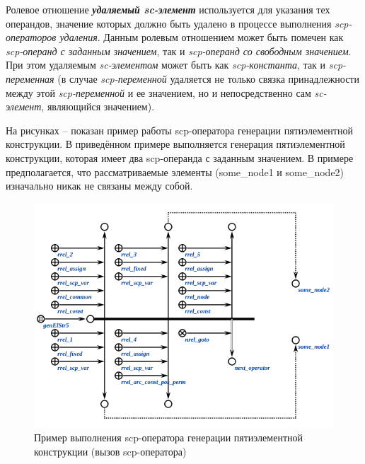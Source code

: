 Ролевое отношение \textbf{\textit{удаляемый sc-элемент\scnrolesign}} используется для указания тех операндов, значение которых должно быть удалено в процессе выполнения \textit{scp-операторов удаления}. Данным ролевым отношением может быть помечен как \textit{scp-операнд с заданным значением\scnrolesign}, так и \textit{scp-операнд со свободным значением\scnrolesign}. При этом удаляемым \textit{sc-элементом} может быть как \textit{scp-константа\scnrolesign}, так и \textit{scp-переменная\scnrolesign} (в случае \textit{scp-переменной\scnrolesign} удаляется не только связка принадлежности между этой \textit{scp-переменной\scnrolesign} и ее значением, но и непосредственно сам \textit{sc-элемент}, являющийся значением).

\begin{SCn}
\begin{scnhaselementset}
\end{scnhaselementset}
\begin{scnhaselementset}
\end{scnhaselementset}
\end{SCn}

На рисунках \textit{} -- \textit{} показан пример работы scp-оператора генерации пятиэлементной конструкции. В приведённом примере выполняется генерация пятиэлементной конструкции, которая имеет два scp-операнда с заданным значением. В примере предполагается, что рассматриваемые элементы (some\_node1 и some\_node2) изначально никак не связаны между собой.

\begin{figure}[H]
	\centering
	\includegraphics[scale=0.8]{images/part3/chapter_situation_management/genElStr5_fafaa.png}
	\caption{Пример выполнения scp-оператора генерации пятиэлементной конструкции (вызов scp-оператора)}
	\label{fig:genElStr5_fafaa}
\end{figure}

